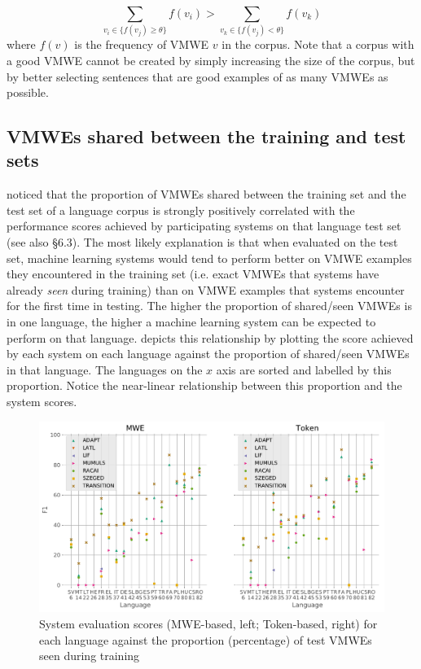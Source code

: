 \documentclass[output=paper,modfonts,nonflat,draftmode]{langsci/langscibook}
\begin{document}
\[
\sum_{v_{i}\in\{f(v_{j})\geq\theta\}}f(v_{i})>\sum_{v_{k}\in\{f(v_{j})<\theta\}}f(v_{k})
\]
where $f(v)$ is the frequency of VMWE $v$ in the corpus. Note that a corpus with a good VMWE  cannot be created by simply increasing the size of the corpus, but by better selecting sentences that are good examples of as many VMWEs as possible. 

\subsection{\label{sec:shared}VMWEs shared between the training and test sets}

\citet{maldonado2017} noticed that the proportion of VMWEs shared between the training set and the test set of a language corpus is strongly positively correlated with the performance scores achieved by participating systems on that language test set (see also  §6.3). The most likely explanation is that when evaluated on the test set, machine learning systems would tend to perform better on VMWE examples they encountered in the training set (i.e. exact VMWEs that systems have already \emph{seen} during training) than on VMWE examples that systems encounter for the first time in testing. The higher the proportion of shared/seen VMWEs is in one language, the higher a machine learning system can be expected to perform on that language.  depicts this relationship by plotting the score achieved by each system on each language against the proportion of shared/seen VMWEs in that language. The languages on the $x$ axis are sorted and labelled by this proportion. Notice the near-linear relationship between this proportion and the system scores.

\begin{figure}
\includegraphics[scale=0.45]{figures/sys-f1-vs-ps-allvmwes.pdf}
\caption{\label{fig:f1-vs-ps-all}System evaluation scores (MWE-based, left; Token-based, right) for each language against the proportion (percentage) of test VMWEs seen during training}
\end{figure}
\end{document}
